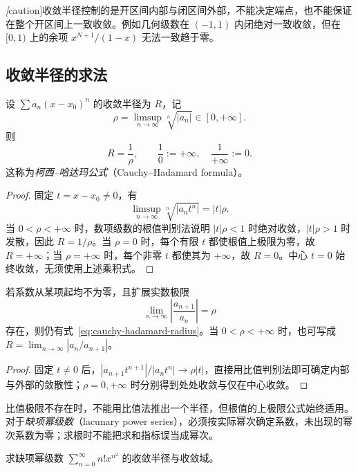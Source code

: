\emph[caution]{收敛半径控制的是开区间内部与闭区间外部，不能决定端点，也不能保证在整个开区间上一致收敛。}例如几何级数在 $(-1,1)$ 内闭绝对一致收敛，但在 $[0,1)$ 上的余项 $x^{N+1}/(1-x)$ 无法一致趋于零。

\subsection{收敛半径的求法}
\label{subsec:computing-the-radius-of-convergence}

\begin{theorem}[柯西--哈达玛定理]
\label{thm:cauchy-hadamard-radius}
设 $\sum a_n(x-x_0)^n$ 的收敛半径为 $R$，记
\[
    \rho=\limsup_{n\to\infty}\sqrt[n]{|a_n|}\in[0,+\infty].
\]
则
\begin{equation}
    R=\frac1\rho,
    \qquad \frac10:=+\infty,\quad \frac1{+\infty}:=0.
    \label{eq:cauchy-hadamard-radius}
\end{equation}
这称为\emph{柯西--哈达玛公式}（Cauchy--Hadamard formula）。
\end{theorem}

\begin{proof}
固定 $t=x-x_0\neq0$，有
\[
    \limsup_{n\to\infty}\sqrt[n]{|a_nt^n|}=|t|\rho.
\]
当 $0<\rho<+\infty$ 时，数项级数的根值判别法说明 $|t|\rho<1$ 时绝对收敛，$|t|\rho>1$ 时发散，因此 $R=1/\rho$。当 $\rho=0$ 时，每个有限 $t$ 都使根值上极限为零，故 $R=+\infty$；当 $\rho=+\infty$ 时，每个非零 $t$ 都使其为 $+\infty$，故 $R=0$。中心 $t=0$ 始终收敛，无须使用上述乘积式。
\end{proof}

\begin{corollary}[比值法]
\label{cor:power-series-ratio-radius}
若系数从某项起均不为零，且扩展实数极限
\[
    \lim_{n\to\infty}\left|\frac{a_{n+1}}{a_n}\right|=\rho
\]
存在，则仍有式~\eqref{eq:cauchy-hadamard-radius}。当 $0<\rho<+\infty$ 时，也可写成 $R=\lim_{n\to\infty}|a_n/a_{n+1}|$。
\end{corollary}

\begin{proof}
固定 $t\neq0$ 后，$|a_{n+1}t^{n+1}|/|a_nt^n|\to\rho|t|$，直接用比值判别法即可确定内部与外部的敛散性；$\rho=0,+\infty$ 时分别得到处处收敛与仅在中心收敛。
\end{proof}

比值极限不存在时，不能用比值法推出一个半径，但根值的上极限公式始终适用。对于\emph{缺项幂级数}（lacunary power series），必须按实际幂次确定系数，未出现的幂次系数为零；求根时不能把求和指标误当成幂次。

\begin{example}
\label{ex:lacunary-factorial-power-series}
求缺项幂级数 $\displaystyle\sum_{n=0}^\infty n!x^{n^2}$ 的收敛半径与收敛域。
\end{example}

